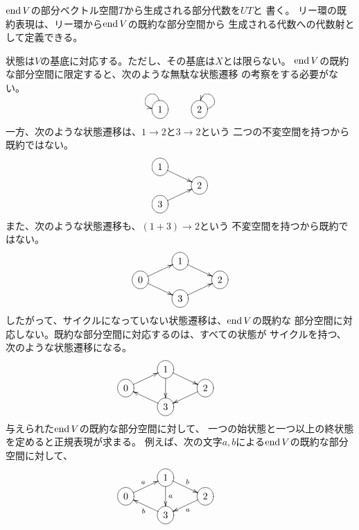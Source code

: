 			$\operatorname{end}V$の部分ベクトル空間$T$から生成される部分代数を$UT$と
			書く。
			リー環の既約表現は、リー環から$\operatorname{end}V$の既約な部分空間から
			生成される代数への代数射として定義できる。

			状態は$V$の基底に対応する。ただし、その基底は$X$とは限らない。
			$\operatorname{end}V$の既約な部分空間に限定すると、次のような無駄な状態遷移
			の考察をする必要がない。
			\begin{equation*}\xymatrix{
				*++[o][F-]{1}\ar@(u,l) & *++[o][F-]{2}\ar@(r,u)
			}\end{equation*}
			一方、次のような状態遷移は、$1\to2$と$3\to2$という
			二つの不変空間を持つから既約ではない。
			\begin{equation*}\xymatrix@R=1pt{
				*++[o][F-]{1}\ar[rd] \\
				& *++[o][F-]{2} \\
				*++[o][F-]{3} \ar[ru] \\
			}\end{equation*}
			また、次のような状態遷移も、$(1+3)\to2$という
			不変空間を持つから既約ではない。
				\begin{equation*}\xymatrix@R=1pt{
				& *++[o][F-]{1}\ar[rd] \\
				*++[o][F-]{0}\ar[ru]\ar[rd] & & *++[o][F-]{2} \\
				& *++[o][F-]{3} \ar[ru] \\
			}\end{equation*}
			したがって、サイクルになっていない状態遷移は、$\operatorname{end}V$の既約な
			部分空間に対応しない。既約な部分空間に対応するのは、すべての状態が
			サイクルを持つ、次のような状態遷移になる。
			\begin{equation*}\xymatrix@R=1pt{
				& *++[o][F-]{1}\ar[rd]\ar[dd] \\
				*++[o][F-]{0}\ar[ru] & & *++[o][F-]{2}\ar[ld] & \\
				& *++[o][F-]{3}\ar[lu] \\
			}\end{equation*}
			与えられた$\operatorname{end}V$の既約な部分空間に対して、
			一つの始状態と一つ以上の終状態を定めると正規表現が求まる。
			例えば、次の文字${a,b}$による$\operatorname{end}V$の既約な部分空間に対して、
			\begin{equation*}\xymatrix@R=1pt{
				& *++[o][F-]{1}\ar[rd]^b\ar[dd]^a \\
				*++[o][F-]{0}\ar[ru]^a & & *++[o][F-]{2}\ar[ld]^a & \\
				& *++[o][F-]{3}\ar[lu]^b \\
			}\end{equation*}
